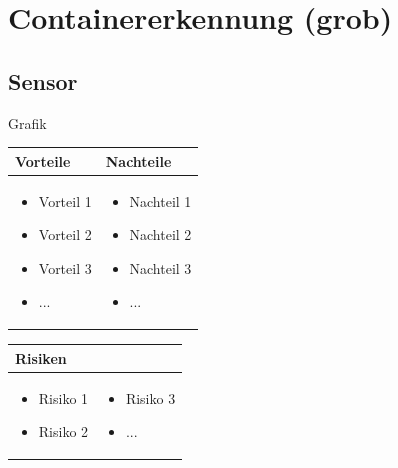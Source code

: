 
\section{Containererkennung (grob)}


\subsection{Sensor}

Grafik

\begin{table}[h]
\begin{tabular}{p{} | p{}}


 \textbf{Vorteile} & \textbf{Nachteile} \\ \hline
	 
\begin{itemize}
\item Vorteil 1
\item Vorteil 2
\item Vorteil 3
\item ...
\end{itemize}

 
 &
 
\begin{itemize}
\item Nachteil 1
\item Nachteil 2
\item Nachteil 3
\item ...
\end{itemize}

\end{tabular}
\end{table}

\begin{table}[h]
\begin{tabular}{p{}p{}}


 \textbf{Risiken} & \\ \hline
	 
\begin{itemize}
\item Risiko 1
\item Risiko 2
\end{itemize}
&
\begin{itemize}
\item Risiko 3
\item ...
\end{itemize}

 
\end{tabular}
\end{table}

